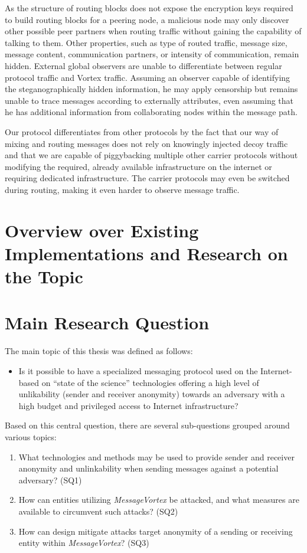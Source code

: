 As the structure of routing blocks does not expose the encryption keys required to build routing blocks for a peering node, a malicious node may only discover other possible peer partners when routing traffic without gaining the capability of talking to them. Other properties, such as type of routed traffic, message size, message content, communication partners, or intensity of communication, remain hidden. External global observers are unable to differentiate between regular protocol traffic and Vortex traffic. Assuming an observer capable of identifying the steganographically hidden information, he may apply censorship but remains unable to trace messages according to externally attributes, even assuming that he has additional information from collaborating nodes within the message path.

Our protocol differentiates from other protocols by the fact that our way of mixing and routing messages does not rely on knowingly injected decoy traffic and that we are capable of piggybacking multiple other carrier protocols without modifying the required, already available infrastructure on the internet or requiring dedicated infrastructure. The carrier protocols may even be switched during routing, making it even harder to observe message traffic.


\chapter{Overview over Existing Implementations and Research on the Topic}

\chapter{Main Research Question}
The main topic of this thesis was defined as follows:
\begin{itemize}
	\item Is it possible to have a specialized messaging protocol used on the Internet-based on ``state of the science'' technologies offering a high level of unlikability (sender and receiver anonymity) towards an adversary with a high budget and privileged access to Internet infrastructure?
\end{itemize}

Based on this central question, there are several sub-questions grouped around various topics:

\begin{enumerate}
	\item What technologies and methods may be used to provide sender and receiver anonymity and unlinkability when sending messages against a potential adversary? (SQ1)
	\item How can entities utilizing \emph{MessageVortex} be attacked, and what measures are available to circumvent such attacks? (SQ2)
	\item How can design mitigate attacks target anonymity of a sending or receiving entity within \emph{MessageVortex}? (SQ3)
\end{enumerate}

